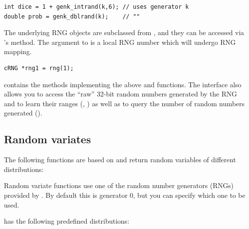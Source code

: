 \begin{verbatim}
int dice = 1 + genk_intrand(k,6); // uses generator k
double prob = genk_dblrand(k);    // ""
\end{verbatim}

The underlying RNG objects are subclassed from ,
and they can be accessed via 's  method.
The argument to  is a local RNG number which will undergo
RNG mapping.

\begin{verbatim}
cRNG *rng1 = rng(1);
\end{verbatim}

 contains the methods implementing the above 
and  functions. The  interface also allows
you to access the ``raw'' 32-bit random numbers generated by the RNG
and to learn their ranges (, ) as well as
to query the number of random numbers generated ().


\subsection{Random variates}

The following functions are based on  and return
random variables of different distributions:

Random variate functions use one of the random number generators (RNGs)
provided by \opp. By default this is generator 0, but you can specify
which one to be used.

{\opp} has the following predefined distributions:

